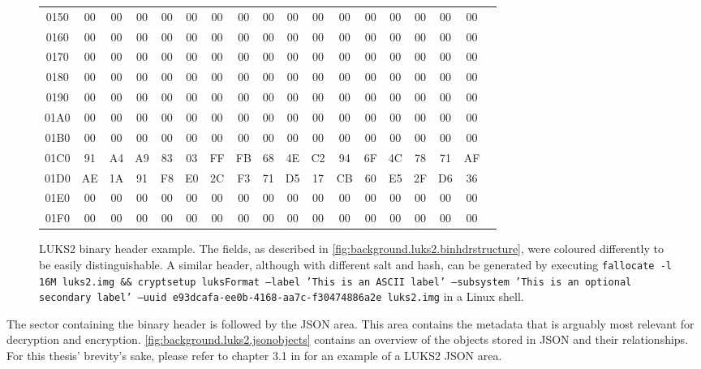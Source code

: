 \begin{figure}[htb!]
\begin{NiceTabular}{c|*{16}{c}|l}
        0150 & 00 & 00 & 00 & 00 & 00 & 00 & 00 & 00 & 00 & 00 & 00 & 00 & 00 & 00 & 00 & 00 &  \\
        0160 & 00 & 00 & 00 & 00 & 00 & 00 & 00 & 00 & 00 & 00 & 00 & 00 & 00 & 00 & 00 & 00 &  \\
        0170 & 00 & 00 & 00 & 00 & 00 & 00 & 00 & 00 & 00 & 00 & 00 & 00 & 00 & 00 & 00 & 00 &  \\
        0180 & 00 & 00 & 00 & 00 & 00 & 00 & 00 & 00 & 00 & 00 & 00 & 00 & 00 & 00 & 00 & 00 &  \\
        0190 & 00 & 00 & 00 & 00 & 00 & 00 & 00 & 00 & 00 & 00 & 00 & 00 & 00 & 00 & 00 & 00 &  \\
        01A0 & 00 & 00 & 00 & 00 & 00 & 00 & 00 & 00 & 00 & 00 & 00 & 00 & 00 & 00 & 00 & 00 &  \\
        01B0 & 00 & 00 & 00 & 00 & 00 & 00 & 00 & 00 & 00 & 00 & 00 & 00 & 00 & 00 & 00 & 00 &  \\
        01C0 & 91 & A4 & A9 & 83 & 03 & FF & FB & 68 & 4E & C2 & 94 & 6F & 4C & 78 & 71 & AF &  \\
        01D0 & AE & 1A & 91 & F8 & E0 & 2C & F3 & 71 & D5 & 17 & CB & 60 & E5 & 2F & D6 & 36 &  \\
        01E0 & 00 & 00 & 00 & 00 & 00 & 00 & 00 & 00 & 00 & 00 & 00 & 00 & 00 & 00 & 00 & 00 &  \\
        01F0 & 00 & 00 & 00 & 00 & 00 & 00 & 00 & 00 & 00 & 00 & 00 & 00 & 00 & 00 & 00 & 00 & 
	\end{NiceTabular}
	\caption[
		LUKS2 binary header example
	]{
		LUKS2 binary header example. The fields, as described in \autoref{fig:background.luks2.binhdrstructure}, were coloured differently to be easily distinguishable. A similar header, although with different salt and hash, can be generated by executing \texttt{fallocate -l 16M luks2.img \&\& cryptsetup luksFormat ---label 'This is an ASCII label' ---subsystem 'This is an optional secondary label' ---uuid e93dcafa-ee0b-4168-aa7c-f30474886a2e luks2.img} in a Linux shell.
	}
	\label{fig:background.luks2.binhdrexample}
\end{figure}

The sector containing the binary header is followed by the JSON area. This area contains the metadata that is arguably most relevant for decryption and encryption. \autoref{fig:background.luks2.jsonobjects} contains an overview of the objects stored in JSON and their relationships. For this thesis' brevity's sake, please refer to chapter 3.1 in \cite{Broz2018} for an example of a LUKS2 JSON area.

